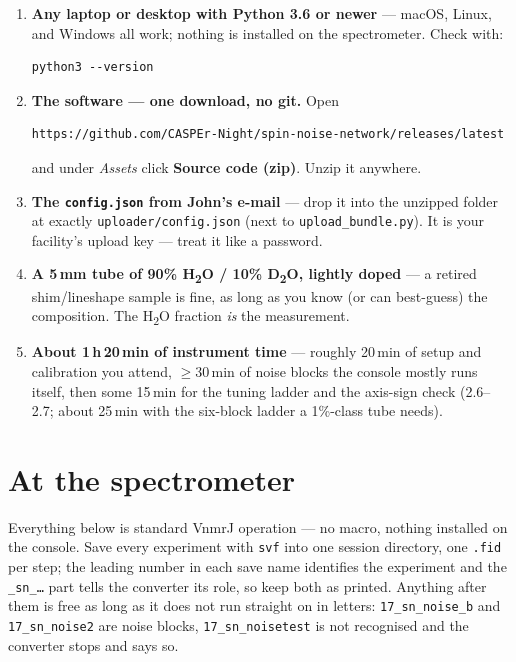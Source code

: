 \documentclass[11pt]{article}
\newcommand{\dtwo}{D\textsubscript{2}O}
\newcommand{\htwo}{H\textsubscript{2}O}
\newcommand{\file}[1]{\texttt{#1}}
\begin{document}
\begin{tcolorbox}[colback=boxbg, colframe=boxframe,
  title=\textbf{What you need}, fonttitle=\bfseries]
\begin{enumerate}[leftmargin=1.4em]
\item \textbf{Any laptop or desktop with Python 3.6 or newer} ---
      macOS, Linux, and Windows all work; nothing is installed on the
      spectrometer. Check with:
\begin{lstlisting}
python3 --version
\end{lstlisting}
\item \textbf{The software --- one download, no git.} Open
\begin{lstlisting}
https://github.com/CASPEr-Night/spin-noise-network/releases/latest
\end{lstlisting}
      and under \emph{Assets} click \textbf{Source code (zip)}. Unzip
      it anywhere.
\item \textbf{The \file{config.json} from John's e-mail} --- drop it
      into the unzipped folder at exactly
      \file{uploader/config.json} (next to
      \file{upload\_bundle.py}). It is your facility's upload key ---
      treat it like a password.
\item \textbf{A 5\,mm tube of 90\% \htwo{} / 10\% \dtwo, lightly
      doped} --- a retired shim/lineshape sample is fine, as long as
      you know (or can best-guess) the composition. The \htwo{}
      fraction \emph{is} the measurement.
\item \textbf{About 1\,h\,20\,min of instrument time} --- roughly
      20\,min of setup and calibration you attend, ${\geq}30$\,min of
      noise blocks the console mostly runs itself, then some 15\,min
      for the tuning ladder and the axis-sign check (2.6--2.7; about
      25\,min with the six-block ladder a 1\%-class tube needs).
\end{enumerate}
\end{tcolorbox}

\section{At the spectrometer}
\label{sec:spectrometer}

Everything below is standard VnmrJ operation --- no macro, nothing
installed on the console. Save every experiment with \texttt{svf} into
one session directory, one \file{.fid} per step; the leading number in
each save name identifies the experiment and the \texttt{\_sn\_\ldots}
part tells the converter its role, so keep both as printed. Anything
after them is free as long as it does not run straight on in letters:
\texttt{17\_sn\_noise\_b} and \texttt{17\_sn\_noise2} are noise blocks,
\texttt{17\_sn\_noisetest} is not recognised and the converter stops
and says so.
\end{document}
